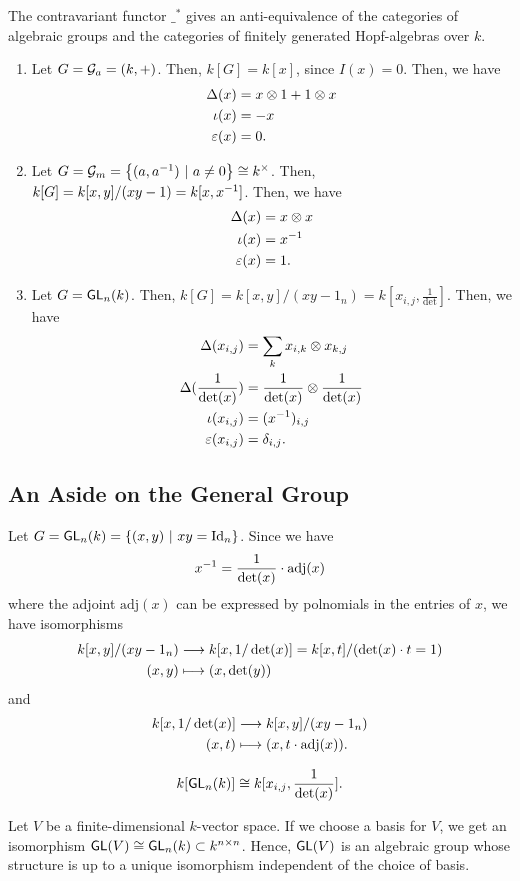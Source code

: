 \begin{theorem}
	The contravariant functor $\_^*$ gives an anti-equivalence of the categories of algebraic groups and the categories of finitely generated Hopf-algebras over $k$.
\end{theorem}

\begin{example}
\begin{enumerate}
	\item Let $G = \mathcal{G}_a = (k,+)$. Then, $k[G] = k[x]$, since $I(x) = 0$. Then, we have
	\begin{align*}
	\Delta(x) &= x \otimes 1 + 1 \otimes x\\
	\iota(x) &= -x\\
	\varepsilon(x) &= 0.
	\end{align*}
	\item Let $G = \mathcal{G}_m = \left\lbrace(a, a^{-1}) ~ | ~ a \neq 0\right\rbrace \overset{}{\cong} k^\times$. Then, $k[G] = k[x,y]/(xy - 1) = k[x,x^{-1}]$. Then, we have
	\begin{align*}
	\Delta(x) &= x \otimes x\\
	\iota(x) &= x^{-1}\\
	\varepsilon(x) &= 1.
	\end{align*}
	\item Let $G = \textsf{GL}_n(k) $. Then, $k[G] = k[x,y]/(xy - 1_n) = k[x_{i,j}, \frac{1}{\det}]$. Then, we have
	\begin{align*}
	\Delta(x_{i,j}) &= \sum_{k}x_{i,k} \otimes x_{k,j} \\
	\Delta(\frac{1}{\det(x)}) &= \frac{1}{\det(x)} \otimes \frac{1}{\det(x)}\\
	\iota(x_{i,j}) &= (x^{-1})_{i,j}\\
	\varepsilon(x_{i,j}) &= \delta_{i,j}.
	\end{align*}
\end{enumerate}
\end{example}

\subsection{An Aside on the General Group}
Let $G = \textsf{GL}_n(k) = \left\lbrace(x,y) ~ | ~ xy = \text{Id}_{n}\right\rbrace$. Since we have
\[ x^{-1} = \frac{1}{\det(x)} \cdot \mathrm{adj}(x) \]
where the adjoint $\mathrm{adj}(x)$ can be expressed by polnomials in the entries of $x$, we have isomorphisms
\begin{align*}
k[x,y] / (xy - 1_n) &\overset{}{\longrightarrow} k[x, 1/ \det(x)] = k[x,t] / (\det(x)\cdot t = 1)\\
(x,y) & \longmapsto (x, \det(y))
\end{align*}
and
\begin{align*}
 k[x, 1/ \det(x)] &\overset{}{\longrightarrow} k[x,y] / (xy - 1_n)\\
(x,t) & \longmapsto (x, t \cdot \mathrm{adj}(x)).
\end{align*}
\begin{lemma}
	\[k[\textsf{GL}_n(k)] \overset{}{\cong} k[x_{i,j}, \frac{1}{\det(x)}].\]
\end{lemma}

\begin{lemma}
	Let $V$ be a finite-dimensional $k$-vector space. If we choose a basis for $V$, we get an isomorphism $\textsf{GL}(V)\overset{}{\cong} \textsf{GL}_n(k)\subset k^{n\times n}$. Hence, $\textsf{GL}(V)$ is an algebraic group whose structure is up to a unique isomorphism independent of the choice of basis.
\end{lemma}
